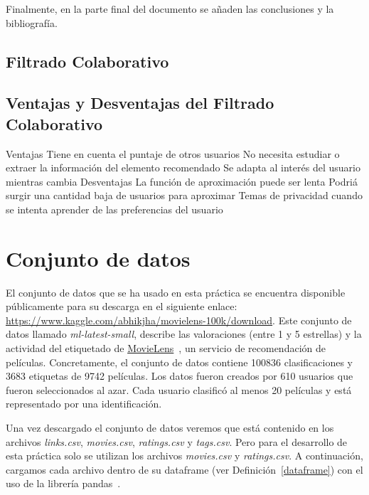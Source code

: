 \documentclass{uimppracticas}
\begin{document}
Finalmente, en la parte final del documento se añaden las conclusiones y la bibliografía.

\subsection{Filtrado Colaborativo}\label{filtro_colaborativo}

\subsection{Ventajas y Desventajas del Filtrado Colaborativo}\label{ventajas_desventajas}

Ventajas
Tiene en cuenta el puntaje de otros usuarios
No necesita estudiar o extraer la información del elemento recomendado
Se adapta al interés del usuario mientras cambia
Desventajas
La función de aproximación puede ser lenta
Podriá surgir una cantidad baja de usuarios para aproximar
Temas de privacidad cuando se intenta aprender de las preferencias del usuario


\newpage

\section{Conjunto de datos}\label{conjunto_datos}

El conjunto de datos que se ha usado en esta práctica se encuentra disponible públicamente para su descarga en el siguiente enlace: \url{https://www.kaggle.com/abhikjha/movielens-100k/download}. Este conjunto de datos llamado \textit{ml-latest-small}, describe las valoraciones (entre 1 y 5 estrellas) y la actividad del etiquetado de \href{http://movielens.org}{MovieLens}~\cite{MovieLens}, un servicio de recomendación de películas. Concretamente, el conjunto de datos contiene 100836 clasificaciones y 3683 etiquetas de 9742 películas. Los datos fueron creados por 610 usuarios que fueron seleccionados al azar. Cada usuario clasificó al menos 20 películas y está representado por una identificación.

Una vez descargado el conjunto de datos veremos que está contenido en los archivos \textit{links.csv}, \textit{movies.csv}, \textit{ratings.csv} y \textit{tags.csv}. Pero para el desarrollo de esta práctica solo se utilizan los archivos \textit{movies.csv} y \textit{ratings.csv}. A continuación, cargamos cada archivo dentro de su dataframe (ver Definición~\ref{dataframe}) con el uso de la librería pandas~\cite{pandas}.
\end{document}
